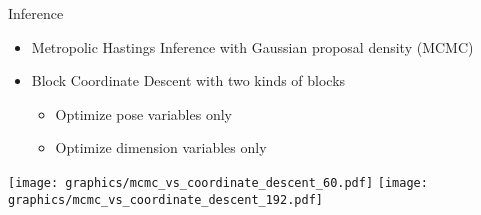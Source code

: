 \begin{frame}{Inference}
  \begin{itemize}
    
    \item
      Metropolic Hastings Inference with Gaussian proposal density (MCMC)

    \item
      Block Coordinate Descent with two kinds of blocks
      \begin{itemize}
        \item
          Optimize pose variables only 
        \item
          Optimize dimension variables only 
      \end{itemize}
  \end{itemize}
  \texttt{[image: graphics/mcmc\_vs\_coordinate\_descent\_60.pdf]}
  \texttt{[image: graphics/mcmc\_vs\_coordinate\_descent\_192.pdf]}
\end{frame}
